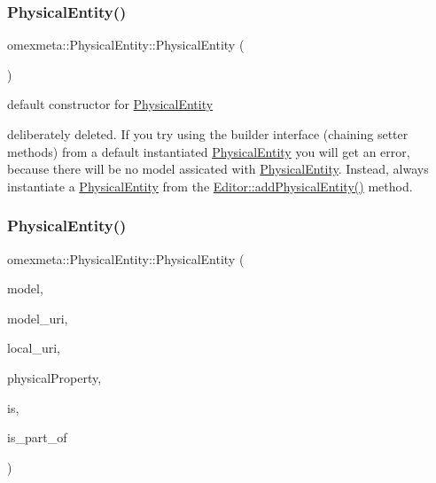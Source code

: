 \subsubsection{\texorpdfstring{Physical\+Entity()}{PhysicalEntity()}\hspace{0.1cm}{\footnotesize\ttfamily [1/4]}}
{\footnotesize\ttfamily omexmeta\+::\+Physical\+Entity\+::\+Physical\+Entity (\begin{DoxyParamCaption}{ }\end{DoxyParamCaption})\hspace{0.3cm}{\ttfamily [delete]}}



default constructor for \hyperlink{classomexmeta_1_1PhysicalEntity}{Physical\+Entity} 

deliberately deleted. If you try using the builder interface (chaining setter methods) from a default instantiated \hyperlink{classomexmeta_1_1PhysicalEntity}{Physical\+Entity} you will get an error, because there will be no model assicated with \hyperlink{classomexmeta_1_1PhysicalEntity}{Physical\+Entity}. Instead, always instantiate a \hyperlink{classomexmeta_1_1PhysicalEntity}{Physical\+Entity} from the \hyperlink{classomexmeta_1_1Editor_a0740831baafe244374ad7a324d51a87e}{Editor\+::add\+Physical\+Entity()} method. \mbox{\label{classomexmeta_1_1PhysicalEntity_a0341918665af91cacdb4481d037c42d2}} 
\subsubsection{\texorpdfstring{Physical\+Entity()}{PhysicalEntity()}\hspace{0.1cm}{\footnotesize\ttfamily [2/4]}}
{\footnotesize\ttfamily omexmeta\+::\+Physical\+Entity\+::\+Physical\+Entity (\begin{DoxyParamCaption}\item[{librdf\+\_\+model $\ast$}]{model,  }\item[{std\+::string}]{model\+\_\+uri,  }\item[{std\+::string}]{local\+\_\+uri,  }\item[{\hyperlink{classomexmeta_1_1PhysicalProperty}{Physical\+Property}}]{physical\+Property,  }\item[{\hyperlink{classomexmeta_1_1Resource}{Resource}}]{is,  }\item[{Resources}]{is\+\_\+part\+\_\+of }\end{DoxyParamCaption})}



